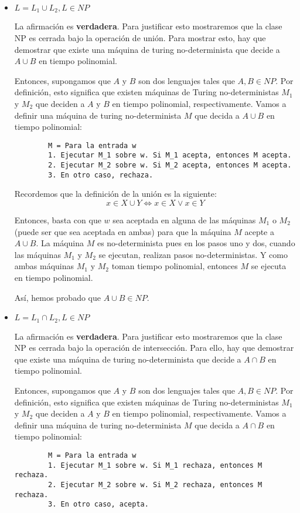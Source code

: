 \documentclass[12pt,letterpaper]{article}
\begin{document}
\begin{itemize}
    \item $L = L_1 \cup L_2, L \in NP$
    
    La afirmación es \textbf{verdadera}. Para justificar 
    esto mostraremos que la clase NP es cerrada bajo la operación de unión. 
    Para mostrar esto, hay que demostrar que existe una máquina de turing 
    no-determinista que decide a $A \cup B$ en tiempo polinomial.

    Entonces, supongamos que $A$ y $B$ son dos lenguajes tales que $A,B \in NP$. 
    Por definición, esto significa que existen máquinas de Turing no-deterministas 
    $M_1$ y $M_2$ que deciden a $A$ y $B$ en tiempo polinomial, respectivamente. 
    Vamos a definir una máquina de turing no-determinista $M$ que decida a 
    $A \cup B$ en tiempo polinomial:
    \begin{verbatim}
        M = Para la entrada w
        1. Ejecutar M_1 sobre w. Si M_1 acepta, entonces M acepta. 
        2. Ejecutar M_2 sobre w. Si M_2 acepta, entonces M acepta. 
        3. En otro caso, rechaza. 
    \end{verbatim}
    Recordemos que la definición de la unión es la siguiente:
    \begin{equation*}
        x \in X \cup Y \Leftrightarrow x \in X \lor x \in Y
    \end{equation*}

    Entonces, basta con que $w$ sea aceptada en alguna de las máquinas $M_1$ 
    o $M_2$ (puede ser que sea aceptada en ambas) para que la máquina $M$ 
    acepte a $A \cup B$. La máquina $M$ es no-determinista pues en los pasos 
    uno y dos, cuando las máquinas $M_1$ y $M_2$ se ejecutan, realizan pasos 
    no-deterministas. Y como ambas máquinas $M_1$ y $M_2$ toman tiempo 
    polinomial, entonces $M$ se ejecuta en tiempo polinomial. 

    Así, hemos probado que $A \cup B \in NP$. 
    
    \item $L = L_1 \cap L_2, L \in NP$
    
    La afirmación es \textbf{verdadera}. Para justificar 
    esto mostraremos que la clase NP es cerrada bajo la operación de 
    intersección. Para ello, hay que demostrar que existe una máquina 
    de turing no-determinista que decide a $A \cap B$ en tiempo polinomial.

    Entonces, supongamos que $A$ y $B$ son dos lenguajes tales que $A,B \in NP$. 
    Por definición, esto significa que existen máquinas de Turing no-deterministas 
    $M_1$ y $M_2$ que deciden a $A$ y $B$ en tiempo polinomial, respectivamente. 
    Vamos a definir una máquina de turing no-determinista $M$ que decida a 
    $A \cap B$ en tiempo polinomial:
    \begin{verbatim}
        M = Para la entrada w
        1. Ejecutar M_1 sobre w. Si M_1 rechaza, entonces M rechaza. 
        2. Ejecutar M_2 sobre w. Si M_2 rechaza, entonces M rechaza. 
        3. En otro caso, acepta.
    \end{verbatim}


\end{itemize}
\end{document}
